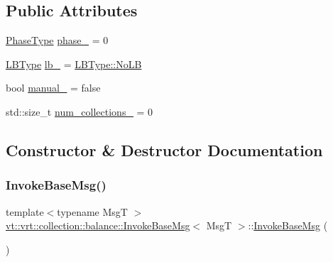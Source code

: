 \subsection*{Public Attributes}
\begin{DoxyCompactItemize}
\item 
\hyperlink{namespacevt_a46ce6733d5cdbd735d561b7b4029f6d7}{Phase\+Type} \hyperlink{structvt_1_1vrt_1_1collection_1_1balance_1_1_invoke_base_msg_a54932333596506829f5a5f422cb585f5}{phase\+\_\+} = 0
\item 
\hyperlink{namespacevt_1_1vrt_1_1collection_1_1balance_ac4f99693509affcc67db182d4aad9b5c}{L\+B\+Type} \hyperlink{structvt_1_1vrt_1_1collection_1_1balance_1_1_invoke_base_msg_ad6ac7cd0c9908958dd11ddd35d88b476}{lb\+\_\+} = \hyperlink{namespacevt_1_1vrt_1_1collection_1_1balance_ac4f99693509affcc67db182d4aad9b5cad12268b59a4f1098aee001f9a1750020}{L\+B\+Type\+::\+No\+LB}
\item 
bool \hyperlink{structvt_1_1vrt_1_1collection_1_1balance_1_1_invoke_base_msg_ab10a289092c060da9ab3f3d0cc4fe4b3}{manual\+\_\+} = false
\item 
std\+::size\+\_\+t \hyperlink{structvt_1_1vrt_1_1collection_1_1balance_1_1_invoke_base_msg_af4a7e6931f2d011e8df902ebcbea7ca8}{num\+\_\+collections\+\_\+} = 0
\end{DoxyCompactItemize}


\subsection{Constructor \& Destructor Documentation}
\mbox{\label{structvt_1_1vrt_1_1collection_1_1balance_1_1_invoke_base_msg_acfc1f9a1ca07cce5d838a8847c3a9709}} 
\subsubsection{\texorpdfstring{Invoke\+Base\+Msg()}{InvokeBaseMsg()}\hspace{0.1cm}{\footnotesize\ttfamily [1/2]}}
{\footnotesize\ttfamily template$<$typename MsgT $>$ \\
\hyperlink{structvt_1_1vrt_1_1collection_1_1balance_1_1_invoke_base_msg}{vt\+::vrt\+::collection\+::balance\+::\+Invoke\+Base\+Msg}$<$ MsgT $>$\+::\hyperlink{structvt_1_1vrt_1_1collection_1_1balance_1_1_invoke_base_msg}{Invoke\+Base\+Msg} (\begin{DoxyParamCaption}{ }\end{DoxyParamCaption})\hspace{0.3cm}{\ttfamily [default]}}

